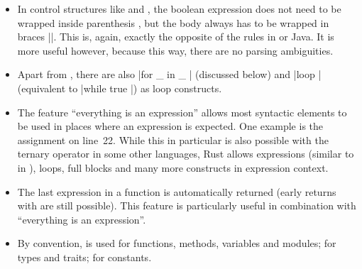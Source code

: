 \begin{itemize}
  \item In control structures like  and , the boolean expression does not need to be wrapped inside parenthesis \code{()}, but the body always has to be wrapped in braces \code|{}|.
  This is, again, exactly the opposite of the rules in \cpp or Java.
  It is more useful however, because this way, there are no parsing ambiguities.
  \item Apart from , there are also \code|for _ in _ {}| (discussed below) and \code|loop {}| (equivalent to \code|while true {}|) as loop constructs.
  \item The feature \enquote{everything is an expression} allows most syntactic elements to be used in places where an expression is expected.
  One example is the assignment on line~22. While this in particular is also possible with the ternary operator  in some other languages, Rust allows  expressions (similar to  in \cpp), loops, full blocks and many more constructs in expression context.
  \item The last expression in a function is automatically returned (early returns with  are still possible).
  This feature is particularly useful in combination with \enquote{everything is an expression}.
  \item By convention,  is used for functions, methods, variables and modules;  for types and traits;  for constants.
\end{itemize}


